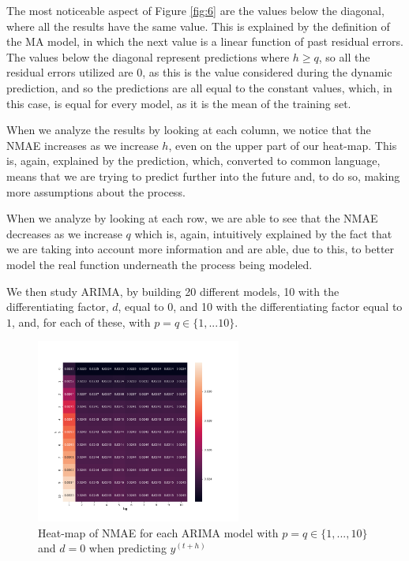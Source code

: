 \documentclass[10pt]{article}
\begin{document}
The most noticeable aspect of Figure \ref{fig:6} are the values below the diagonal, where all the results have the same value. This is explained by the definition of the MA model, in which the next value is a linear function of past residual errors. The values below the diagonal represent predictions where $h \geq q$, so all the residual errors utilized are $0$, as this is the value considered during the dynamic prediction, and so the predictions are all equal to the constant values, which, in this case, is equal for every model, as it is the mean of the training set.

When we analyze the results by looking at each column, we notice that the \textsc{NMAE} increases as we increase $h$, even on the upper part of our heat-map. This is, again, explained by the prediction, which, converted to common language, means that we are trying to predict further into the future and, to do so, making more assumptions about the process. 

When we analyze by looking at each row, we are able to see that the \textsc{NMAE} decreases as we increase $q$ which is, again, intuitively explained by the fact that we are taking into account more information and are able, due to this, to better model the real function underneath the process being modeled.

We then study ARIMA, by building 20 different models, 10 with the differentiating factor, $d$, equal to $0$, and 10 with the differentiating factor equal to $1$, and, for each of these, with $p=q\in\{1,...10\}$.

\begin{figure}[!ht]
    \centering
    \includegraphics[width=0.6\textwidth,height=\textheight,keepaspectratio]{../arima_d_0_nmae_heatmap.png}
    \caption{Heat-map of \textsc{NMAE} for each ARIMA model with $p=q\in\{1,...,10\}$ and $d=0$ when predicting $y^{(t+h)}$}
    \label{fig:7}
\end{figure}
\end{document}
